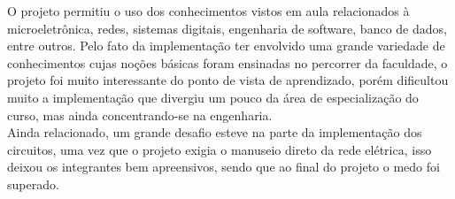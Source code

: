 \label{Cap:consideracoes_finais}

O projeto permitiu o uso dos conhecimentos vistos em aula relacionados à microeletrônica, redes, sistemas digitais, engenharia de software, banco de dados, entre outros. Pelo fato da implementação ter envolvido uma grande variedade de conhecimentos cujas noções básicas foram ensinadas no percorrer da faculdade, o projeto foi muito interessante do ponto de vista de aprendizado, porém dificultou muito a implementação que divergiu um pouco da área de especialização do curso, mas ainda concentrando-se na engenharia.\\
Ainda relacionado, um grande desafio esteve na parte da implementação dos circuitos, uma vez que o projeto exigia o manuseio direto da rede elétrica, isso deixou os integrantes bem apreensivos, sendo que ao final do projeto o medo foi superado.